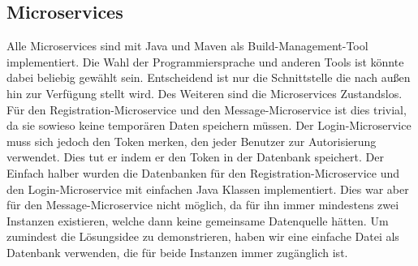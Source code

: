 \subsection{Microservices}
Alle Microservices sind mit Java und Maven als Build-Management-Tool implementiert. Die Wahl der Programmiersprache und anderen Tools ist könnte dabei beliebig gewählt sein. Entscheidend ist nur die Schnittstelle die nach außen hin zur Verfügung stellt wird. Des Weiteren sind die Microservices Zustandslos. Für den Registration-Microservice und den Message-Microservice ist dies trivial, da sie sowieso keine temporären Daten speichern müssen. Der Login-Microservice muss sich jedoch den Token merken, den jeder Benutzer zur Autorisierung verwendet. Dies tut er indem er den Token in der Datenbank speichert.
Der Einfach halber wurden die Datenbanken für den Registration-Microservice und den Login-Microservice mit einfachen Java Klassen implementiert. Dies war aber für den Message-Microservice nicht möglich, da für ihn immer mindestens zwei Instanzen existieren, welche dann keine gemeinsame Datenquelle hätten. Um zumindest die Lösungsidee zu demonstrieren, haben wir eine einfache Datei als Datenbank verwenden, die für beide Instanzen immer zugänglich ist.